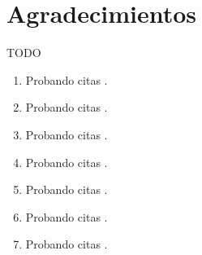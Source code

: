 

\chapter*{Agradecimientos} 

TODO \\

\begin{enumerate}
\item Probando citas \cite{bentley:1999}.
\item Probando citas \cite{bringhurst:2002}.
\item Probando citas \cite{cormen:2001}.
\item Probando citas \cite{dueck:trio}.
\item Probando citas \cite{knuth:1976}.
\item Probando citas \cite{knuth:1974}.
\item Probando citas \cite{sommerville:1992}.
\end{enumerate}

